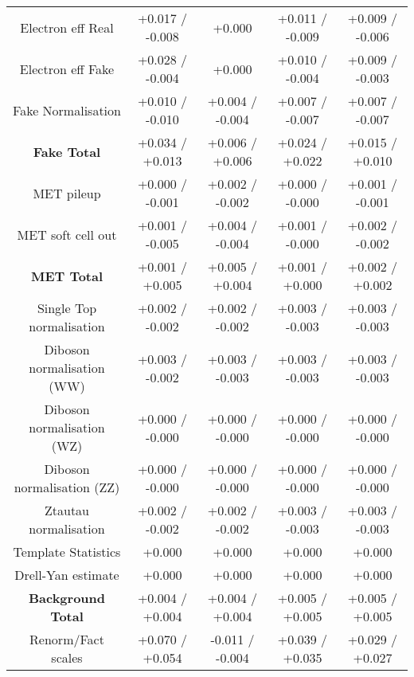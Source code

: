 \begin{table}[htbp]
\begin{center}
\begin{tabular}{|c|c|c|c|c|}
Electron eff Real                     &+0.017   / -0.008   & +0.000              & +0.011   / -0.009   & +0.009   / -0.006  \\
Electron eff Fake                     &+0.028   / -0.004   & +0.000              & +0.010   / -0.004   & +0.009   / -0.003  \\
Fake Normalisation                    &+0.010   / -0.010   & +0.004   / -0.004   & +0.007   / -0.007   & +0.007   / -0.007  \\
\hline
\textbf{Fake Total}                   &+0.034   / +0.013   & +0.006   / +0.006   & +0.024   / +0.022   & +0.015   / +0.010  \\
\hline
MET pileup                            &+0.000   / -0.001   & +0.002   / -0.002   & +0.000   / -0.000   & +0.001   / -0.001  \\
MET soft cell out                     &+0.001   / -0.005   & +0.004   / -0.004   & +0.001   / -0.000   & +0.002   / -0.002  \\
\hline
\textbf{MET Total}                    &+0.001   / +0.005   & +0.005   / +0.004   & +0.001   / +0.000   & +0.002   / +0.002  \\
\hline
Single Top normalisation              &+0.002   / -0.002   & +0.002   / -0.002   & +0.003   / -0.003   & +0.003   / -0.003  \\
Diboson normalisation (WW)            &+0.003   / -0.002   & +0.003   / -0.003   & +0.003   / -0.003   & +0.003   / -0.003  \\
Diboson normalisation (WZ)            &+0.000   / -0.000   & +0.000   / -0.000   & +0.000   / -0.000   & +0.000   / -0.000  \\
Diboson normalisation (ZZ)            &+0.000   / -0.000   & +0.000   / -0.000   & +0.000   / -0.000   & +0.000   / -0.000  \\
Ztautau normalisation                 &+0.002   / -0.002   & +0.002   / -0.002   & +0.003   / -0.003   & +0.003   / -0.003  \\
Template Statistics                   &+0.000              & +0.000              & +0.000              & +0.000             \\
Drell-Yan estimate                    &+0.000              & +0.000              & +0.000              & +0.000             \\
\hline
\textbf{Background Total}             &+0.004   / +0.004   & +0.004   / +0.004   & +0.005   / +0.005   & +0.005   / +0.005  \\
\hline
Renorm/Fact scales                    &+0.070   / +0.054   & -0.011   / -0.004   & +0.039   / +0.035   & +0.029   / +0.027  \\

\end{tabular}
\end{center}
\end{table}
